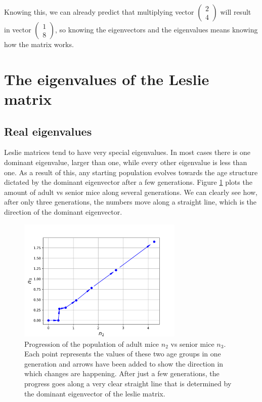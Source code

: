 \documentclass{tufte-book} %
\begin{document}
Knowing this, we can already predict that multiplying vector $\begin{pmatrix}  2\\ 4 \end{pmatrix}$ will result in vector  $\begin{pmatrix}  1\\ 8 \end{pmatrix}$, so knowing the eigenvectors and the eigenvalues means  knowing how the matrix works.

\section{The eigenvalues of the Leslie matrix}

\subsection{Real eigenvalues}
Leslie matrices tend to have very special eigenvalues. In most cases there is one dominant eigenvalue, larger than one, while every other eigenvalue is less than one. As a result of this, any starting population evolves towards the age structure dictated by the dominant eigenvector after a few generations. Figure \ref{fig:leslie_phase} plots the amount of adult vs senior mice along several generations. We can clearly see how, after only three generations, the numbers move along a straight line, which is the direction of the dominant eigenvector.

\begin{figure}
	\begin{center}
		\includegraphics[width=0.7\textwidth]{project_n2_n3}	
	\end{center}
	\caption{Progression of the population of adult mice $n_2$ vs senior mice $n_3$. Each point represents the values of these two age groups in one generation and arrows have been added to show the direction in which changes are happening. After just a few generations, the progress goes along a very clear straight line that is determined by the dominant eigenvector of the leslie matrix. }
	\label{fig:leslie_phase}
\end{figure}
\end{document}
